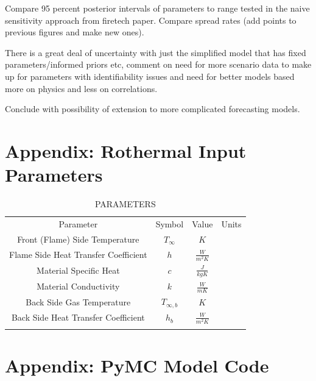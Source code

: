\documentclass[11pt]{article}
\begin{document}
Compare 95 percent posterior intervals of parameters to range tested in the naive sensitivity approach from firetech paper. Compare spread rates (add points to previous figures and make new ones).

There is a great deal of uncertainty with just the simplified model that has fixed parameters/informed priors etc, comment on need for more scenario data to make up for parameters with identifiability issues and need for better models based more on physics and less on correlations.

Conclude with possibility of extension to more complicated forecasting models.

\clearpage
\appendix
\section{Appendix: Rothermal Input Parameters}
\label{ap:table}

\begin{table}[h]
\caption{PARAMETERS}
\begin{center}
  \begin{tabular}{cccc}
    \hline\noalign{\smallskip}
    Parameter & Symbol & Value & Units \\
    \noalign{\smallskip}\hline\noalign{\smallskip}
    Front (Flame) Side Temperature & $T_\infty$ & $K$\\
    Flame Side Heat Transfer Coefficient & $h$ & $\frac{W}{m^2K}$\\ 
    Material Specific Heat & $c$ & $\frac{J}{kgK}$\\ 
    Material Conductivity & $k$ & $\frac{W}{mK}$\\ 
    Back Side Gas Temperature & $T_{\infty,b}$ & $K$\\ 
    Back Side Heat Transfer Coefficient & $h_b$ & $\frac{W}{m^2K}$\\ 
    \noalign{\smallskip}\hline
  \end{tabular}
\end{center}
\label{tab:para}
\end{table}

\section{Appendix: PyMC Model Code}

% 
% 
\end{document}
